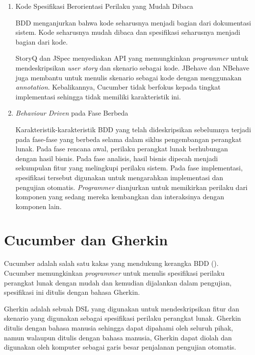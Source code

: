 \begin{enumerate}
    \item Kode Spesifikasi Berorientasi Perilaku yang Mudah Dibaca 

    BDD menganjurkan bahwa kode seharusnya menjadi bagian dari dokumentasi sistem. Kode seharusnya
    mudah dibaca dan spesifikasi seharusnya menjadi bagian dari kode. 

    StoryQ dan JSpec menyediakan API yang memungkinkan \emph{programmer} untuk mendeskripsikan
    \emph{user story} dan skenario sebagai kode. JBehave dan NBehave juga membantu untuk menulis
    skenario sebagai kode dengan menggunakan \emph{annotation}. Kebalikannya, Cucumber tidak
    berfokus kepada tingkat implementasi sehingga tidak memiliki karakteristik ini.
    
    \item \emph{Behaviour Driven} pada Fase Berbeda
    
    Karakteristik-karakteristik BDD yang telah dideskripsikan sebelumnya terjadi
    pada fase-fase yang berbeda selama dalam siklus pengembangan perangkat lunak.
    Pada fase rencana awal, perilaku perangkat lunak berhubungan dengan hasil bisnis.
    Pada fase analisis, hasil bisnis dipecah menjadi sekumpulan fitur yang melingkupi
    perilaku sistem. 
    Pada fase implementasi, spesifikasi tersebut digunakan untuk mengarahkan implementasi
    dan pengujian otomatis. \emph{Programmer} dianjurkan untuk memikirkan perilaku dari
    komponen yang sedang mereka kembangkan dan interaksinya dengan komponen lain.

\end{enumerate}



\section{Cucumber dan Gherkin}

Cucumber adalah salah satu kakas yang mendukung kerangka BDD (\cite{cucumber_book}).
Cucumber memungkinkan \emph{programmer} untuk menulis spesifikasi
perilaku perangkat lunak dengan mudah dan kemudian dijalankan dalam pengujian,
spesifikasi ini ditulis dengan bahasa Gherkin.

Gherkin adalah sebuah DSL yang digunakan untuk mendeskripsikan fitur dan skenario
yang digunakan sebagai spesifikasi perilaku perangkat lunak. Gherkin ditulis
dengan bahasa manusia sehingga dapat dipahami oleh seluruh pihak, namun walaupun
ditulis dengan bahasa manusia, Gherkin dapat diolah dan digunakan oleh
komputer sebagai garis besar penjalanan pengujian otomatis.

